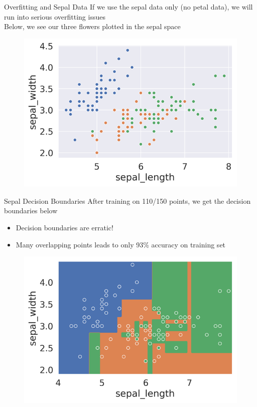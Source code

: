 \documentclass[aspectratio=169]{../latex_main/tntbeamer}  %
\begin{document}
	
	\begin{frame}{Overfitting and Sepal Data}
	    If we use the sepal data only (no petal data), we will run into serious overfitting issues\\
	    \bigskip
	    Below, we see our three flowers plotted in the sepal space
	    \begin{figure}
	        \centering
	        \includegraphics[scale=.65]{Bild36}
	    \end{figure}
	\end{frame}
	
	
	\begin{frame}{Sepal Decision Boundaries}
	    After training on 110/150 points, we get the decision boundaries below
	    \begin{itemize}
	        \item Decision boundaries are erratic!
	        \item Many overlapping points leads to only 93\% accuracy on training set
	    \end{itemize}
	    \begin{figure}
	        \centering
	        \includegraphics[scale=.65]{Bild37}
	    \end{figure}
	\end{frame}
	
\end{document}
